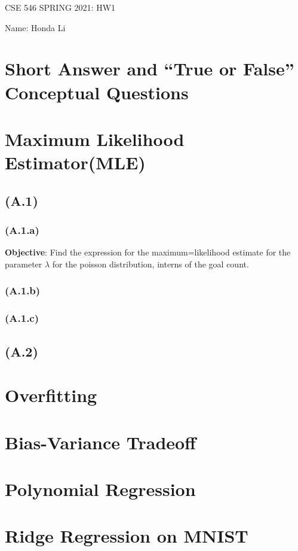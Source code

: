 \documentclass[]{article}
\begin{document}
\begin{center}
    CSE 546 SPRING 2021: HW1 
\end{center}
\begin{center}
    Name: Honda Li
\end{center}

\section*{Short Answer and ``True or False'' Conceptual Questions}

\section*{Maximum Likelihood Estimator(MLE)}
    \subsection*{(A.1)}
        \subsubsection*{(A.1.a)}
            \hspace{1.1em}
            \textbf{Objective}: Find the expression for the maximum=likelihood estimate for the parameter $\lambda$ for the poisson distribution, interns of the goal count. 
             
        \subsubsection*{(A.1.b)}
        \subsubsection*{(A.1.c)}
    \subsection*{(A.2)}



\section*{Overfitting}

\section*{Bias-Variance Tradeoff}

\section*{Polynomial Regression}

\section*{Ridge Regression on MNIST}
\end{document}
